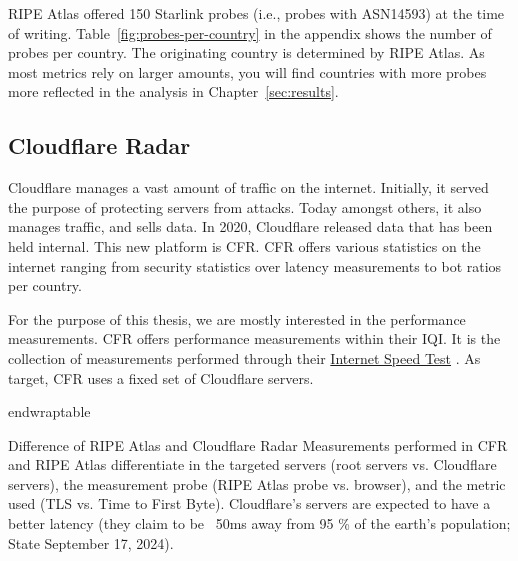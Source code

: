 RIPE Atlas offered 150 Starlink probes (i.e., probes with ASN14593) at the time
of writing. Table~\ref{fig:probes-per-country} in the appendix shows the number
of probes per country. The originating country is determined by RIPE Atlas. As
most metrics rely on larger amounts, you will find countries with more probes
more reflected in the analysis in Chapter~\ref{sec:results}.

\subsection{Cloudflare Radar} \label{sec:cloudflare-radar}

Cloudflare manages a vast amount of traffic on the internet. Initially, it
served the purpose of protecting servers from attacks. Today amongst others, it
also manages traffic, and sells data. In 2020, Cloudflare released data that
has been held internal. This new platform is \ac{CFR}. \ac{CFR} offers various
statistics on the internet ranging from security statistics over latency
measurements to bot ratios per country.

For the purpose of this thesis, we are mostly interested in the performance
measurements. \ac{CFR} offers performance measurements within their \ac{IQI}.
It is the collection of measurements performed through their
\href{https://speed.cloudflare.com/}{Internet Speed Test}
\cite{DavidBelson2023, CloudflareRadarDocsIQI}. As target, \ac{CFR} uses a
fixed set of Cloudflare servers.

end{wraptable}

\begin{takeaway}{Difference of RIPE Atlas and Cloudflare Radar}
	Measurements performed in \ac{CFR} and RIPE Atlas differentiate in the
	targeted servers (root servers vs. Cloudflare servers), the measurement
	probe (RIPE Atlas probe vs. browser), and the metric used (TLS vs. Time
	to First Byte). Cloudflare's servers are expected to have a better
	latency (they claim to be ~50ms away from 95 \% of the earth's
	population; State September 17, 2024).
\end{takeaway}

